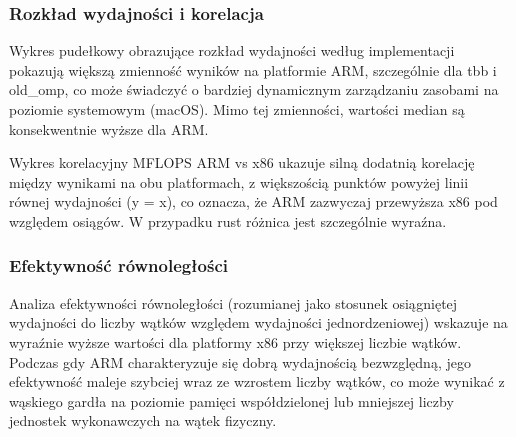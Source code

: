 \subsubsection{Rozkład wydajności i korelacja}
Wykres pudełkowy obrazujące rozkład wydajności według implementacji pokazują większą zmienność wyników na platformie ARM, szczególnie dla tbb i old\_omp, co może świadczyć o bardziej dynamicznym zarządzaniu zasobami na poziomie systemowym (macOS). Mimo tej zmienności, wartości median są konsekwentnie wyższe dla ARM.

Wykres korelacyjny MFLOPS ARM vs x86 ukazuje silną dodatnią korelację między wynikami na obu platformach, z większością punktów powyżej linii równej wydajności (y = x), co oznacza, że ARM zazwyczaj przewyższa x86 pod względem osiągów. W przypadku rust różnica jest szczególnie wyraźna.

\subsubsection{Efektywność równoległości}
Analiza efektywności równoległości (rozumianej jako stosunek osiągniętej wydajności do liczby wątków względem wydajności jednordzeniowej) wskazuje na wyraźnie wyższe wartości dla platformy x86 przy większej liczbie wątków. Podczas gdy ARM charakteryzuje się dobrą wydajnością bezwzględną, jego efektywność maleje szybciej wraz ze wzrostem liczby wątków, co może wynikać z wąskiego gardła na poziomie pamięci współdzielonej lub mniejszej liczby jednostek wykonawczych na wątek fizyczny.

